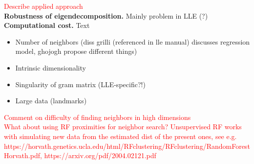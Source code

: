 \textcolor{red}{Describe applied approach}
\\

\textbf{Robustness of eigendecomposition.} Mainly problem in LLE (?)
\\

\textbf{Computational cost.} Text
\\

\begin{itemize}
  \item Number of neighbors (diss grilli (referenced in lle manual) discusses 
  regression model, ghojogh propose different things)
  \item Intrinsic dimensionality
  \item Singularity of gram matrix (LLE-specific?!)
  \item Large data (landmarks)
\end{itemize}

\textcolor{red}{Comment on difficulty of finding neighbors in high dimensions}
\\
\textcolor{red}{What about using RF proximities for neighbor search? 
Unsupervised RF works with simulating new data from the estimated dist of the 
present ones, see e.g. https://horvath.genetics.ucla.edu/html/RFclustering/RFclustering/RandomForestHorvath.pdf, https://arxiv.org/pdf/2004.02121.pdf}
